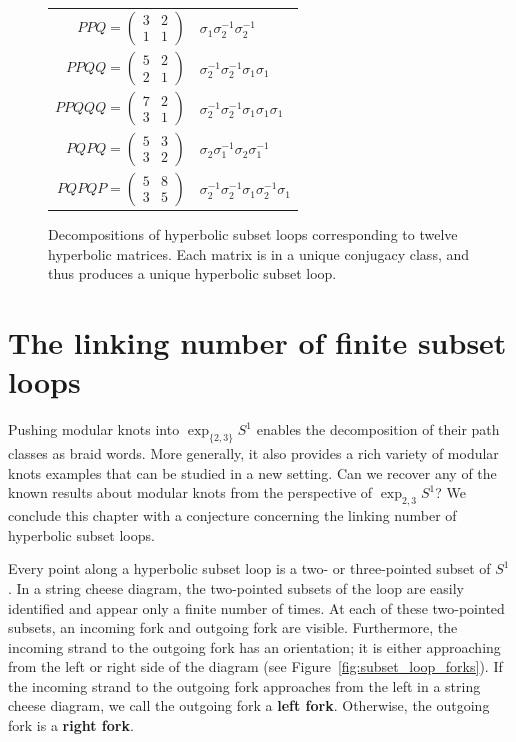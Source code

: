 \documentclass[12pt,twoside]{reedthesis}
\theoremstyle{definition}
\newcommand{\exptwothree}{\exp_{\{2,3\}}}
\newcommand{\defnphrase}[1]{\textbf{#1}}
\begin{document}
\begin{figure}[p]
\begin{tabular}{r l}
   $PPQ = \begin{pmatrix}3 & 2 \\ 1 & 1\end{pmatrix}$ & $\sigma_1 \sigma_2^{-1} \sigma_2^{-1}$ \\[1em]
   $PPQQ = \begin{pmatrix}5 & 2 \\ 2 & 1\end{pmatrix}$ & $\sigma_2^{-1} \sigma_2^{-1} \sigma_1 \sigma_1$ \\[1em]
   $PPQQQ = \begin{pmatrix}7 & 2 \\ 3 & 1\end{pmatrix}$ & $\sigma_2^{-1} \sigma_2^{-1} \sigma_1 \sigma_1 \sigma_1$ \\[1em]
   $PQPQ = \begin{pmatrix}5 & 3 \\ 3 & 2\end{pmatrix}$ & $\sigma_2 \sigma_1^{-1} \sigma_2 \sigma_1^{-1}$ \\[1em]
   $PQPQP = \begin{pmatrix}5 & 8 \\ 3 & 5\end{pmatrix}$ & $\sigma_2^{-1} \sigma_2^{-1} \sigma_1 \sigma_2^{-1} \sigma_1$
  \end{tabular}
  \caption{Decompositions of hyperbolic subset loops corresponding to twelve hyperbolic matrices. Each matrix is in a unique conjugacy class, and thus produces a unique hyperbolic subset loop.}
  \label{fig:subset_loop_decompositions_table}
\end{figure}

\section{The linking number of finite subset loops}

Pushing modular knots into $\exptwothree S^1$ enables the decomposition of their path classes as braid words.
More generally, it also provides a rich variety of modular knots examples that can be studied in a new setting.
Can we recover any of the known results about modular knots from the perspective of $\exp_{2,3} S^1$?
We conclude this chapter with a conjecture concerning the linking number of hyperbolic subset loops.

Every point along a hyperbolic subset loop is a two- or three-pointed subset of $S^1$.
In a string cheese diagram, the two-pointed subsets of the loop are easily identified and appear only a finite number of times.
At each of these two-pointed subsets, an incoming fork and outgoing fork are visible.
Furthermore, the incoming strand to the outgoing fork has an orientation; it is either approaching from the left or right side of the diagram (see Figure~\ref{fig:subset_loop_forks}). 
If the incoming strand to the outgoing fork approaches from the left in a string cheese diagram, we call the outgoing fork a \defnphrase{left fork}.
Otherwise, the outgoing fork is a \defnphrase{right fork}.
\end{document}
